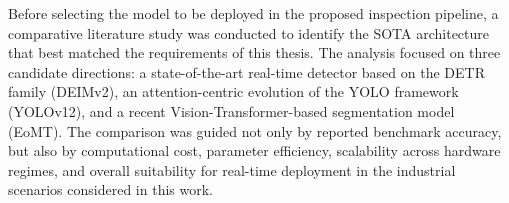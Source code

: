 
Before selecting the model to be deployed in the proposed inspection pipeline, a comparative literature study was conducted to identify the SOTA architecture that best matched the requirements of this thesis. The analysis focused on three candidate directions: a state-of-the-art real-time detector based on the DETR family (DEIMv2), an attention-centric evolution of the YOLO framework (YOLOv12), and a recent Vision-Transformer-based segmentation model (EoMT). The comparison was guided not only by reported benchmark accuracy, but also by computational cost, parameter efficiency, scalability across hardware regimes, and overall suitability for real-time deployment in the industrial scenarios considered in this work.
